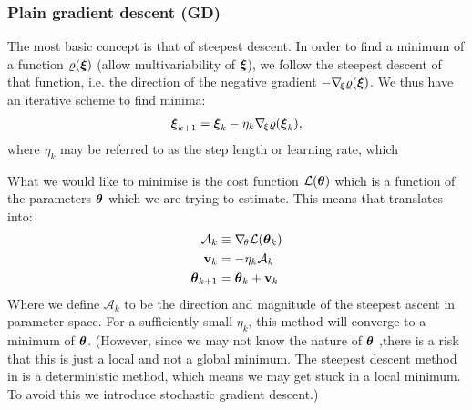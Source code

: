     \subsubsection{Plain gradient descent (GD)}\label{sec:plain_gradient_descent}
        The most basic concept is that of steepest descent. In order to find a minimum of a function $\varrho(\boldsymbol{\xi})$ (allow multivariability of $\boldsymbol{\xi}$), we follow the steepest descent of that function, i.e. the direction of the negative gradient $-\nabla_{\!\xi} \varrho(\boldsymbol{\xi})$. We thus have an iterative scheme to find minima:
        \begin{align}\label{eq:steepest_descent}
            \boldsymbol{\xi}_{k+1} = \boldsymbol{\xi}_k - \eta_k\nabla_{\!\xi} \varrho(\boldsymbol{\xi}_k),
        \end{align}
        where $\eta_k$ may be referred to as the step length or learning rate, which \fillertext

        What we would like to minimise is the cost function $\mathcal{L}(\boldsymbol{\theta})$ which is a function of the parameters $\boldsymbol{\theta}$ which we are trying to estimate. This means that  translates into:
        \begin{align}\label{eq:steepest_descent_cost_function}
            \mathcal{A}_k &\equiv \nabla_{\!\theta} \mathcal{L}(\boldsymbol{\theta}_k) \nonumber \\
            \mathbf{v}_k &= -\eta_k\mathcal{A}_k \nonumber \\
            \boldsymbol{\theta}_{k+1} &= \boldsymbol{\theta}_k + \mathbf{v}_k
        \end{align}
        Where we define $\mathcal{A}_k$ to be the direction and magnitude of the steepest ascent in parameter space. 
        For a sufficiently small $\eta_k$, this method will converge to a minimum of $\boldsymbol{\theta}$. (However, since we may not know the nature of $\boldsymbol{\theta}$ ,there is a risk that this is just a local and not a global minimum. The steepest descent method in  is a deterministic method, which means we may get stuck in a local minimum. To avoid this we introduce stochastic gradient descent.) 

